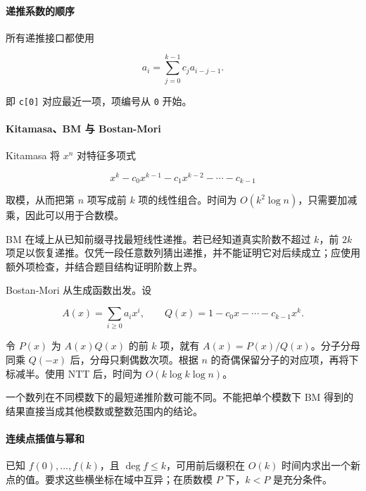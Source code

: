 \hypertarget{ux9012ux63a8ux7cfbux6570ux7684ux987aux5e8f}{%
\paragraph{递推系数的顺序}\label{ux9012ux63a8ux7cfbux6570ux7684ux987aux5e8f}}

所有递推接口都使用

\[
a_i=\sum_{j=0}^{k-1}c_j a_{i-j-1}.
\]

即 \passthrough{\lstinline!c[0]!} 对应最近一项，项编号从 \passthrough{\lstinline!0!} 开始。

\hypertarget{kitamasabm-ux4e0e-bostan-mori}{%
\paragraph{Kitamasa、BM 与 Bostan-Mori}\label{kitamasabm-ux4e0e-bostan-mori}}

Kitamasa 将 \(x^n\) 对特征多项式

\[
x^k-c_0x^{k-1}-c_1x^{k-2}-\cdots-c_{k-1}
\]

取模，从而把第 \(n\) 项写成前 \(k\) 项的线性组合。时间为 \(O(k^2\log n)\)，只需要加减乘，因此可以用于合数模。

BM 在域上从已知前缀寻找最短线性递推。若已经知道真实阶数不超过 \(k\)，前 \(2k\) 项足以恢复递推。仅凭一段任意数列猜出递推，并不能证明它对后续成立；应使用额外项检查，并结合题目结构证明阶数上界。

Bostan-Mori 从生成函数出发。设

\[
A(x)=\sum_{i\ge0}a_i x^i,\qquad
Q(x)=1-c_0x-\cdots-c_{k-1}x^k.
\]

令 \(P(x)\) 为 \(A(x)Q(x)\) 的前 \(k\) 项，就有 \(A(x)=P(x)/Q(x)\)。分子分母同乘 \(Q(-x)\) 后，分母只剩偶数次项。根据 \(n\) 的奇偶保留分子的对应项，再将下标减半。使用 NTT 后，时间为 \(O(k\log k\log n)\)。

一个数列在不同模数下的最短递推阶数可能不同。不能把单个模数下 BM 得到的结果直接当成其他模数或整数范围内的结论。

\hypertarget{ux8fdeux7eedux70b9ux63d2ux503cux4e0eux5e42ux548c}{%
\paragraph{连续点插值与幂和}\label{ux8fdeux7eedux70b9ux63d2ux503cux4e0eux5e42ux548c}}

已知 \(f(0),\ldots,f(k)\)，且 \(\deg f\le k\)，可用前后缀积在 \(O(k)\) 时间内求出一个新点的值。要求这些横坐标在域中互异；在质数模 \(P\) 下，\(k<P\) 是充分条件。

